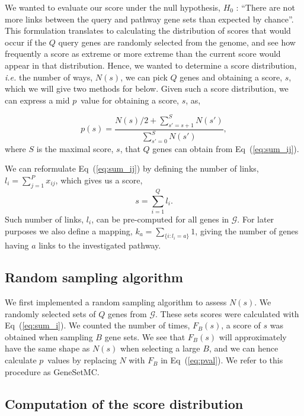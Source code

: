 \documentclass[10pt,letterpaper]{article}
\begin{document}
We wanted to evaluate our score under the null hypothesis, $H_0$ : ``There are not more links between the query and pathway gene sets than expected by chance''. This  formulation translates to calculating the distribution of scores that would occur if the $Q$ query genes are randomly selected from the genome, and see how frequently a score as extreme or more extreme than the current score would appear in that distribution. Hence, we wanted to determine a score distribution, {\em i.e.} the number of ways, $N(s)$, we can pick $Q$ genes and obtaining a score, $s$, which we will give two methods for below. Given such a score distribution, we can express a mid $p$~value\cite{lancaster1961significance,hwang2001optimality} for obtaining a score, $s$, as,

\begin{equation}
p(s)=\frac{N(s)/2 +\sum_{s'=s+1}^{S} N(s')}{\sum_{s'=0}^{S} N(s')},
\label{eq:pval}
\end{equation}
where $S$ is the maximal score, $s$, that $Q$ genes can obtain from Eq~(\ref{eq:sum_ij}).

We can reformulate Eq~(\ref{eq:sum_ij}) by defining the number of links, $l_i=\sum_{j=1}^P x_{ij}$, which gives us a score,
\begin{equation}
s=\sum_{i=1}^Q l_i.
\label{eq:sum_i}
\end{equation}
Such number of links, $l_i$, can be pre-computed for all genes in $\mathcal{G}$. For later purposes we also define a mapping, $k_a=\sum_{\{i:l_i=a\}}1$, giving the number of genes having $a$ links to the investigated pathway.



\subsection*{Random sampling algorithm}

We first implemented a random sampling algorithm to assess $N(s)$. We randomly selected sets of $Q$ genes from $\mathcal{G}$. These sets scores were calculated with Eq~(\ref{eq:sum_i}). We counted the number of times, $F_B(s)$, a score of $s$ was obtained when sampling $B$ gene sets. We see that $F_B(s)$ will approximately have the same shape as $N(s)$ when selecting a large $B$, and we can hence calculate $p$~values by replacing $N$ with $F_B$ in Eq~(\ref{eq:pval}). We refer to this procedure as GeneSetMC.

\subsection*{Computation of the score distribution}
\end{document}
